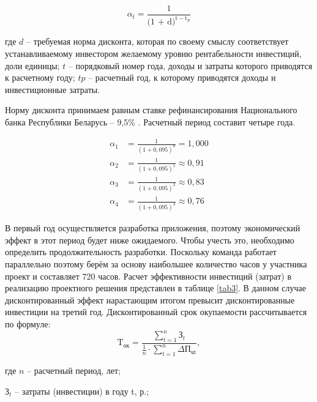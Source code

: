 \begin{equation}
	\alpha_t = \frac{1}{\text{(1 + d)}^{\text{t}-\text{t}_\text{p}}}
\end{equation}
\newpage

где $d$ – требуемая норма дисконта, которая по своему смыслу соответствует устанавливаемому инвестором желаемому уровню рентабельности инвестиций, доли единицы;
$t$  – порядковый номер года, доходы и затраты которого приводятся к расчетному году;
$tp$  – расчетный год, к которому приводятся доходы и инвестиционные затраты.

Норму дисконта принимаем равным ставке рефинансирования Национального банка Республики Беларусь – 9,5\% \cite{refr}. Расчетный период составит четыре года.

\begin{equation}
	\begin{aligned}
		\alpha_1 & = \frac{1}{(1 + 0{,}095)^0} = 1{,}000      \\
		\alpha_2 & = \frac{1}{(1 + 0{,}095)^1} \approx 0{,}91 \\
		\alpha_3 & = \frac{1}{(1 + 0{,}095)^2} \approx 0{,}83 \\
		\alpha_4 & = \frac{1}{(1 + 0{,}095)^3} \approx 0{,}76
	\end{aligned}
\end{equation}

В первый год осуществляется разработка приложения, поэтому экономический эффект в этот период будет ниже ожидаемого.
Чтобы учесть это, необходимо определить продолжительность разработки. Поскольку команда работает параллельно поэтому берём за основу наибольшее количество часов у участника
проект и составляет 720 часов. Расчет эффективности инвестиций (затрат) в реализацию проектного решения представлен в таблице \ref{tab3}.
В данном случае дисконтированный эффект нарастающим итогом превысит дисконтированные инвестиции на третий год. Дисконтированный срок окупаемости рассчитывается по формуле:
\begin{equation}
	\text{T}_{\text{ок}} = \frac{\sum_{t=1}^{n}{\text{З}_t}}{\frac{1}{n} \cdot \sum_{t=1}^{n} \Delta\text{П}_{\text{чt}}},
\end{equation}

где $n$ – расчетный период, лет;

$\text{З}_t$ – затраты (инвестиции) в году t, р.;

